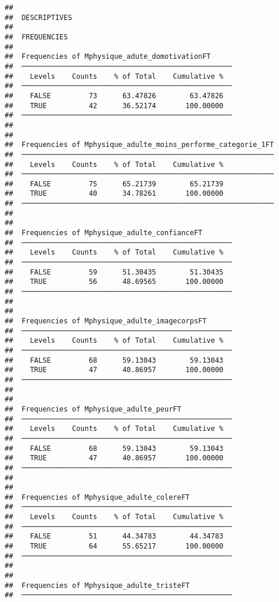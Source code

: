 \documentclass[
]{article}
\begin{document}
\begin{verbatim}
## 
##  DESCRIPTIVES
## 
##  FREQUENCIES
## 
##  Frequencies of Mphysique_adute_domotivationFT      
##  ────────────────────────────────────────────────── 
##    Levels    Counts    % of Total    Cumulative %   
##  ────────────────────────────────────────────────── 
##    FALSE         73      63.47826        63.47826   
##    TRUE          42      36.52174       100.00000   
##  ────────────────────────────────────────────────── 
## 
## 
##  Frequencies of Mphysique_adulte_moins_performe_categorie_1FT 
##  ──────────────────────────────────────────────────────────── 
##    Levels    Counts    % of Total    Cumulative %   
##  ──────────────────────────────────────────────────────────── 
##    FALSE         75      65.21739        65.21739   
##    TRUE          40      34.78261       100.00000   
##  ──────────────────────────────────────────────────────────── 
## 
## 
##  Frequencies of Mphysique_adulte_confianceFT        
##  ────────────────────────────────────────────────── 
##    Levels    Counts    % of Total    Cumulative %   
##  ────────────────────────────────────────────────── 
##    FALSE         59      51.30435        51.30435   
##    TRUE          56      48.69565       100.00000   
##  ────────────────────────────────────────────────── 
## 
## 
##  Frequencies of Mphysique_adulte_imagecorpsFT       
##  ────────────────────────────────────────────────── 
##    Levels    Counts    % of Total    Cumulative %   
##  ────────────────────────────────────────────────── 
##    FALSE         68      59.13043        59.13043   
##    TRUE          47      40.86957       100.00000   
##  ────────────────────────────────────────────────── 
## 
## 
##  Frequencies of Mphysique_adulte_peurFT             
##  ────────────────────────────────────────────────── 
##    Levels    Counts    % of Total    Cumulative %   
##  ────────────────────────────────────────────────── 
##    FALSE         68      59.13043        59.13043   
##    TRUE          47      40.86957       100.00000   
##  ────────────────────────────────────────────────── 
## 
## 
##  Frequencies of Mphysique_adulte_colereFT           
##  ────────────────────────────────────────────────── 
##    Levels    Counts    % of Total    Cumulative %   
##  ────────────────────────────────────────────────── 
##    FALSE         51      44.34783        44.34783   
##    TRUE          64      55.65217       100.00000   
##  ────────────────────────────────────────────────── 
## 
## 
##  Frequencies of Mphysique_adulte_tristeFT           
##  ────────────────────────────────────────────────── 

\end{verbatim}
\end{document}
